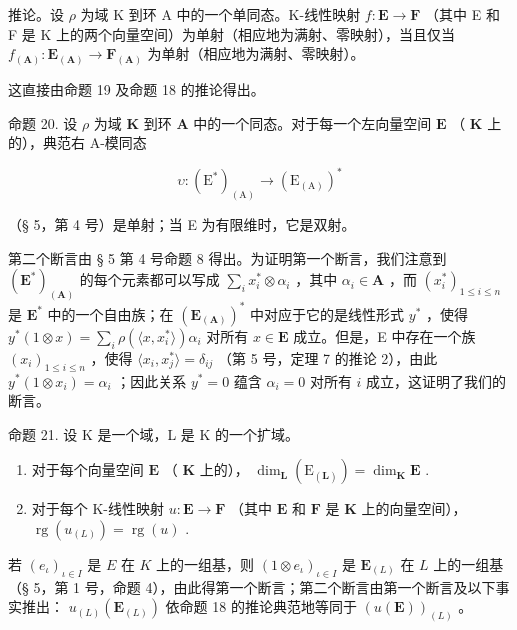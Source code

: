 推论。设 \(\rho\) 为域 K 到环 A 中的一个单同态。K-线性映射 \(f: \mathbf{E} \to \mathbf{F}\) （其中 E 和 F 是 K 上的两个向量空间）为单射（相应地为满射、零映射），当且仅当 \(f_{(\mathbf{A})}: \mathbf{E}_{(\mathbf{A})} \to \mathbf{F}_{(\mathbf{A})}\) 为单射（相应地为满射、零映射）。

这直接由命题 19 及命题 18 的推论得出。

命题 20. 设 \(\rho\) 为域 \(\mathbf{K}\) 到环 \(\mathbf{A}\) 中的一个同态。对于每一个左向量空间 \(\mathbf{E}\) （ \(\mathbf{K}\) 上的），典范右 A-模同态

\[
\upsilon : \left(\mathrm{E} ^ {*}\right) _ {(\mathrm{A})} \rightarrow \left(\mathrm{E} _ {(\mathrm{A})}\right) ^ {*}
\]

（§ 5，第 4 号）是单射；当 E 为有限维时，它是双射。

第二个断言由 § 5 第 4 号命题 8 得出。为证明第一个断言，我们注意到 \((\mathbf{E}^{*})_{(\mathbf{A})}\) 的每个元素都可以写成 \(\sum_{i} x_{i}^{*} \otimes \alpha_{i}\) ，其中 \(\alpha_{i} \in \mathbf{A}\) ，而 \((x_{i}^{*})_{1 \leqslant i \leqslant n}\) 是 \(\mathbf{E}^{*}\) 中的一个自由族；在 \((\mathbf{E}_{(\mathbf{A})})^{*}\) 中对应于它的是线性形式 \(y^{*}\) ，使得 \(y^{*}(1 \otimes x) = \sum_{i} \rho(\langle x, x_{i}^{*} \rangle)\alpha_{i}\) 对所有 \(x \in \mathbf{E}\) 成立。但是，E 中存在一个族 \((x_{i})_{1 \leqslant i \leqslant n}\) ，使得 \(\langle x_{i}, x_{j}^{*} \rangle = \delta_{ij}\) （第 5 号，定理 7 的推论 2），由此 \(y^{*}(1 \otimes x_{i}) = \alpha_{i}\) ；因此关系 \(y^{*} = 0\) 蕴含 \(\alpha_{i} = 0\) 对所有 \(i\) 成立，这证明了我们的断言。

命题 21. 设 K 是一个域，L 是 K 的一个扩域。

\begin{enumerate}
\def\labelenumi{(\roman{enumi})}
\item
  对于每个向量空间 \(\mathbf{E}\) （ \(\mathbf{K}\) 上的）， \(\dim_{\mathbf{L}}(\mathrm{E}_{(\mathbf{L})}) = \dim_{\mathbf{K}}\mathbf{E}\) .
\item
  对于每个 K-线性映射 \(u: \mathbf{E} \to \mathbf{F}\) （其中 \(\mathbf{E}\) 和 \(\mathbf{F}\) 是 \(\mathbf{K}\) 上的向量空间）， \(\operatorname{rg}(u_{(L)}) = \operatorname{rg}(u)\) .
\end{enumerate}

若 \((e_{\iota})_{\iota\in I}\) 是 \(E\) 在 \(K\) 上的一组基，则 \((1\otimes e_{\iota})_{\iota\in I}\) 是 \(\mathbf{E}_{(L)}\) 在 \(L\) 上的一组基（§ 5，第 1 号，命题 4），由此得第一个断言；第二个断言由第一个断言及以下事实推出： \(u_{(L)}(\mathbf{E}_{(L)})\) 依命题 18 的推论典范地等同于 \((u(\mathbf{E}))_{(L)}\) 。

